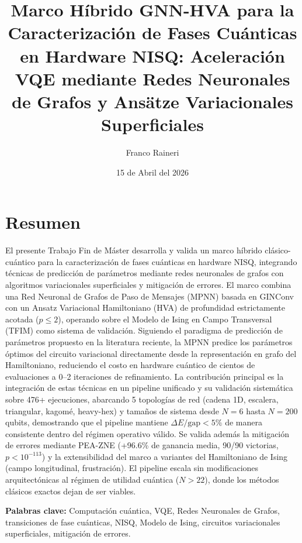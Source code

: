 \documentclass[11pt,a4paper,spanish]{book}
\title{Marco Híbrido GNN-HVA para la Caracterización de Fases Cuánticas en Hardware NISQ: Aceleración VQE mediante Redes Neuronales de Grafos y Ansätze Variacionales Superficiales}
\author{Franco Raineri}
\date{15 de Abril del 2026}
\begin{document}
\renewcommand{\listfigurename}{Índice de figuras}
\renewcommand{\listtablename}{Índice de tablas}
\renewcommand{\contentsname}{Índice de contenidos}
\renewcommand{\figurename}{Figura}
\renewcommand{\tablename}{Tabla}

\maketitle
\frontmatter
\tableofcontents
\listoffigures
\listoftables

\chapter{Resumen}

El presente Trabajo Fin de Máster desarrolla y valida un marco híbrido clásico-cuántico para la caracterización de fases cuánticas en hardware NISQ, integrando técnicas de predicción de parámetros mediante redes neuronales de grafos con algoritmos variacionales superficiales y mitigación de errores. El marco combina una Red Neuronal de Grafos de Paso de Mensajes (MPNN) basada en GINConv con un Ansatz Variacional Hamiltoniano (HVA) de profundidad estrictamente acotada ($p \leq 2$), operando sobre el Modelo de Ising en Campo Transversal (TFIM) como sistema de validación. Siguiendo el paradigma de predicción de parámetros propuesto en la literatura reciente, la MPNN predice los parámetros óptimos del circuito variacional directamente desde la representación en grafo del Hamiltoniano, reduciendo el costo en hardware cuántico de cientos de evaluaciones a 0--2 iteraciones de refinamiento. La contribución principal es la integración de estas técnicas en un pipeline unificado y su validación sistemática sobre 476+ ejecuciones, abarcando 5 topologías de red (cadena 1D, escalera, triangular, kagomé, heavy-hex) y tamaños de sistema desde $N=6$ hasta $N=200$ qubits, demostrando que el pipeline mantiene $\Delta E/\text{gap} < 5\%$ de manera consistente dentro del régimen operativo válido. Se valida además la mitigación de errores mediante PEA-ZNE (+96.6\% de ganancia media, 90/90 victorias, $p < 10^{-113}$) y la extensibilidad del marco a variantes del Hamiltoniano de Ising (campo longitudinal, frustración). El pipeline escala sin modificaciones arquitectónicas al régimen de utilidad cuántica ($N > 22$), donde los métodos clásicos exactos dejan de ser viables.

\vspace{0.5cm}
{\bf Palabras clave:} Computación cuántica, VQE, Redes Neuronales de Grafos, transiciones de fase cuánticas, NISQ, Modelo de Ising, circuitos variacionales superficiales, mitigación de errores.
\end{document}
